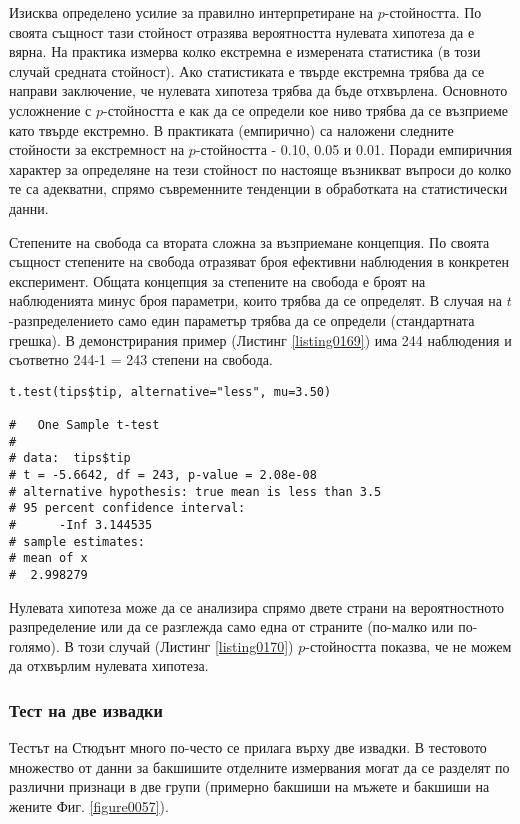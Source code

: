 Изисква определено усилие за правилно интерпретиране на $p$-стойността. По своята същност тази стойност отразява вероятността нулевата хипотеза да е вярна. На практика измерва колко екстремна е измерената статистика (в този случай средната стойност). Ако статистиката е твърде екстремна трябва да се направи заключение, че нулевата хипотеза трябва да бъде отхвърлена. Основното усложнение с $p$-стойността е как да се определи кое ниво трябва да се възприеме като твърде екстремно. В практиката (емпирично) са наложени следните стойности за екстремност на $p$-стойността - 0.10, 0.05 и 0.01. Поради емпиричния характер за определяне на тези стойност по настояще възникват въпроси до колко те са адекватни, спрямо съвременните тенденции в обработката на статистически данни. 

Степените на свобода са втората сложна за възприемане концепция. По своята същност степените на свобода отразяват броя ефективни наблюдения в конкретен експеримент. Общата концепция за степените на свобода е броят на наблюденията минус броя параметри, които трябва да се определят. В случая на $t$-разпределението само един параметър трябва да се определи (стандартната грешка). В демонстрирания пример (Листинг \ref{listing0169}) има 244 наблюдения и съответно 244-1 = 243 степени на свобода. 

\begin{lstlisting}[caption=Едностранна t-статистика, label=listing0170]
t.test(tips$tip, alternative="less", mu=3.50)

# 	One Sample t-test
# 
# data:  tips$tip
# t = -5.6642, df = 243, p-value = 2.08e-08
# alternative hypothesis: true mean is less than 3.5
# 95 percent confidence interval:
#      -Inf 3.144535
# sample estimates:
# mean of x 
#  2.998279 
\end{lstlisting}

Нулевата хипотеза може да се анализира спрямо двете страни на вероятностното разпределение или да се разглежда само една от страните (по-малко или по-голямо). В този случай (Листинг \ref{listing0170}) $p$-стойността показва, че не можем да отхвърлим нулевата хипотеза. 

\subsubsection{Тест на две извадки}

Тестът на Стюдънт много по-често се прилага върху две извадки. В тестовото множество от данни за бакшишите отделните измервания могат да се разделят по различни признаци в две групи (примерно бакшиши на мъжете и бакшиши на жените Фиг. \ref{figure0057}).

